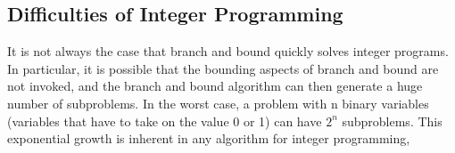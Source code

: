\documentclass{beamer}
\begin{document}
\subsection{Difficulties of Integer Programming}
\begin{frame}
	It is not always the case that branch and bound quickly
	solves integer programs. In particular, it is possible that the bounding aspects
	of branch and bound are not invoked, and the branch and bound algorithm can
	then generate a huge number of subproblems. In the worst case, a problem
	with n binary variables (variables that have to take on the value 0 or 1) can
	have $2^n$ subproblems. This exponential growth is inherent in any algorithm for
	integer programming, 
\end{frame}
\end{document}
